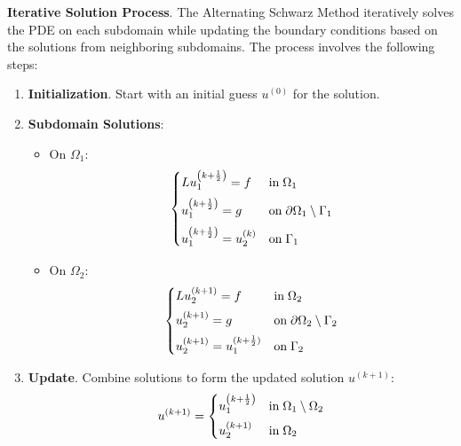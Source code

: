 \begin{examplebox}
    \highspace
    \textbf{Iterative Solution Process}. The Alternating Schwarz Method iteratively solves the PDE on each subdomain while updating the boundary conditions based on the solutions from neighboring subdomains. The process involves the following steps:
    \begin{enumerate}
        \item \textbf{Initialization}. Start with an initial guess $ u^{(0)} $ for the solution.
        
        \item \textbf{Subdomain Solutions}:
        \begin{itemize}
            \item On $\Omega_{1}$:
            \begin{equation*}
                \begin{cases}
                    L u_{1}^{\left(k+\frac{1}{2}\right)} = f & \text{in} \; \Omega_{1} \vspace{.5em}\\
                    u_{1}^{\left(k+\frac{1}{2}\right)} = g & \text{on} \; \partial \Omega_{1} \setminus \Gamma_{1} \vspace{.5em}\\
                    u_{1}^{\left(k+\frac{1}{2}\right)} = u_{2}^{(k)} & \text{on} \; \Gamma_{1}
                \end{cases}
            \end{equation*}

            \item On $\Omega_{2}$:
            \begin{equation*}
                \begin{cases}
                    L u_{2}^{(k+1)} = f & \text{in} \; \Omega_{2} \vspace{.5em}\\
                    u_{2}^{(k+1)} = g & \text{on} \; \partial \Omega_{2} \setminus \Gamma_{2} \vspace{.5em}\\
                    u_{2}^{(k+1)} = u_{1}^{(k+\frac{1}{2})} & \text{on} \; \Gamma_{2}
                \end{cases}
            \end{equation*}
        \end{itemize}

        \item \textbf{Update}. Combine solutions to form the updated solution $u^{\left(k+1\right)}$:
        \begin{equation*}
            u^{(k+1)} =
            \begin{cases}
                u_{1}^{\left(k+\frac{1}{2}\right)} & \text{in} \; \Omega_{1} \setminus \Omega_{2} \vspace{.5em}\\
                u_{2}^{\left(k+1\right)} & \text{in} \; \Omega_{2}
            \end{cases}
        \end{equation*}
    \end{enumerate}


\end{examplebox}
